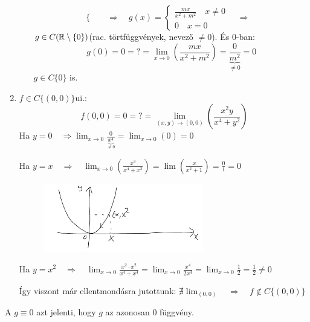 \documentclass[a4paper,11.5pt]{article}
\begin{document}
\begin{task}
\begin{enumerate}
\begin{enumerate}
\[\begin{cases}
				\end{cases}\quad  \Rightarrow\quad g(x)=\begin{cases}
					\frac{mx}{x^2+m^2}\quad x\not=0\\
					0\quad x=0
				\end{cases}\quad \Rightarrow\quad   \]
				$g\in C(\mathbb{R}\setminus\{0\})$\quad (rac. törtfüggvények, nevező $\not=0$). És 0-ban:
				\[ g(0)=0=?=\lim_{x\to0}\left(\frac{mx}{x^2+m^2}\right)=\frac{0}{\underbrace{m^2}_{\not=0}}=0 \]
				$g\in C\{0\}$ is.
			\end{enumerate}
			\item $f\in C\{ (0,0) \}$\quad ui.:
			\[ f(0,0)=0=?=\lim_{(x,y)\to(0,0)}\left(\frac{x^2y}{x^4+y^2}\right) \]
			Ha $\displaystyle y=0\quad \Rightarrow\lim_{x\to0}\frac{0}{\underbrace{x^4}_{\not=0}}=\lim_{x\to0}(0)=0$
			
			Ha $\displaystyle y=x\quad \Rightarrow\quad \lim_{x\to0}\left(\frac{x^3}{x^4+x^2}\right)=\lim\left(\frac{x}{x^2+1}\right)=\frac{0}{1}=0$
			
			\begin{figure}[H]
				\centering
				\includegraphics[height=3cm]{../2zh/kepek/27.png}
				\caption{}
			\end{figure}
			Ha $\displaystyle y = x^2\quad \Rightarrow\quad \lim_{x\to0}\frac{x^2\cdot x^2}{x^4+x^4}=\lim_{x\to0}\frac{x^4}{2x^4}=\lim_{x\to0}\frac{1}{2}=\frac{1}{2}\not=0$
			
			Így viszont már ellentmondásra jutottunk: $\nexists\lim_{(0,0)}\quad \Rightarrow \quad f\notin C\{(0,0)\}$
		\end{enumerate}
		\begin{note}
			A $g\equiv0$ azt jelenti, hogy $g$ az azonosan 0 függvény.
		\end{note}
	\end{task}
\end{document}
